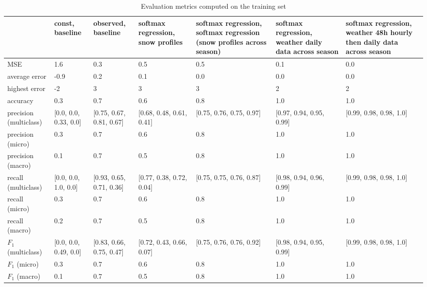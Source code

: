 \begin{table}[H]
\caption{Evaluation metrics computed on the training set}
\label{tbl:sais_eval_training}
\begin{tabular}{lllllll}
\toprule
 & const, baseline & observed, baseline & softmax regression, snow profiles & softmax regression, softmax regression (snow profiles across season) & softmax regression, weather daily data across season & softmax regression, weather 48h hourly then daily data across season \\
\midrule
MSE & 1.6 & 0.3 & 0.5 & 0.5 & 0.1 & 0.0 \\
average error & -0.9 & 0.2 & 0.1 & 0.0 & 0.0 & 0.0 \\
highest error & -2 & 3 & 3 & 3 & 2 & 2 \\
accuracy & 0.3 & 0.7 & 0.6 & 0.8 & 1.0 & 1.0 \\
precision (multiclass) & [0.0, 0.0, 0.33, 0.0] & [0.75, 0.67, 0.81, 0.67] & [0.68, 0.48, 0.61, 0.41] & [0.75, 0.76, 0.75, 0.97] & [0.97, 0.94, 0.95, 0.99] & [0.99, 0.98, 0.98, 1.0] \\
precision (micro) & 0.3 & 0.7 & 0.6 & 0.8 & 1.0 & 1.0 \\
precision (macro) & 0.1 & 0.7 & 0.5 & 0.8 & 1.0 & 1.0 \\
recall (multiclass) & [0.0, 0.0, 1.0, 0.0] & [0.93, 0.65, 0.71, 0.36] & [0.77, 0.38, 0.72, 0.04] & [0.75, 0.75, 0.76, 0.87] & [0.98, 0.94, 0.96, 0.99] & [0.99, 0.98, 0.98, 1.0] \\
recall (micro) & 0.3 & 0.7 & 0.6 & 0.8 & 1.0 & 1.0 \\
recall (macro) & 0.2 & 0.7 & 0.5 & 0.8 & 1.0 & 1.0 \\
$F_1$ (multiclass) & [0.0, 0.0, 0.49, 0.0] & [0.83, 0.66, 0.75, 0.47] & [0.72, 0.43, 0.66, 0.07] & [0.75, 0.76, 0.76, 0.92] & [0.98, 0.94, 0.95, 0.99] & [0.99, 0.98, 0.98, 1.0] \\
$F_1$ (micro) & 0.3 & 0.7 & 0.6 & 0.8 & 1.0 & 1.0 \\
$F_1$ (macro) & 0.1 & 0.7 & 0.5 & 0.8 & 1.0 & 1.0 \\
\bottomrule
\end{tabular}
\end{table}
